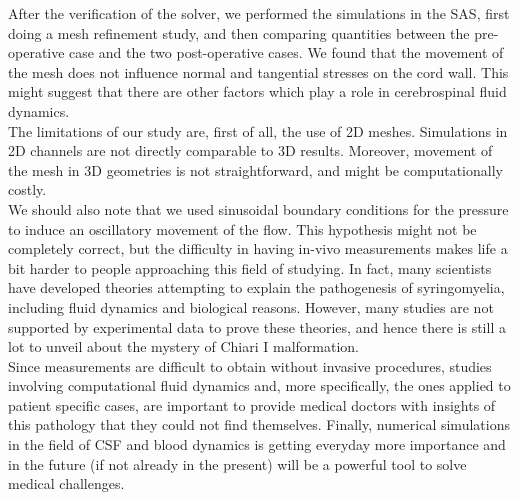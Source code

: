 \documentclass[a4paper,11pt,openright,twoside]{book}
\begin{document}
After the verification of the solver, we performed the simulations in the SAS, first doing a mesh refinement study, and then comparing quantities between the pre-operative case and the two post-operative cases. We found that the movement of the mesh does not influence normal and tangential stresses on the cord wall. This might suggest that there are other factors which play a role in cerebrospinal fluid dynamics. \\

The limitations of our study are, first of all, the use of 2D meshes. Simulations in 2D channels are not directly comparable to 3D results. Moreover, movement of the mesh in 3D geometries is not straightforward, and might be computationally costly. \\
We should also note that we used sinusoidal boundary conditions for the pressure to induce an oscillatory movement of the flow. This hypothesis might not be completely correct, but the difficulty in having in-vivo measurements makes life a bit harder to people approaching this field of studying. In fact, many scientists have developed theories attempting to explain the pathogenesis of syringomyelia, including fluid dynamics and biological reasons. However, many studies are not supported by experimental data to prove these theories, and hence there is still a lot to unveil about the mystery of Chiari I malformation. \\

Since measurements are difficult to obtain without invasive procedures, studies involving computational fluid dynamics and, more specifically, the ones applied to patient specific cases, are important to provide medical doctors with insights of this pathology that they could not find themselves. Finally, numerical simulations in the field of CSF and blood dynamics is getting everyday more importance and in the future (if not already in the present) will be a powerful tool to solve medical challenges.
\end{document}
